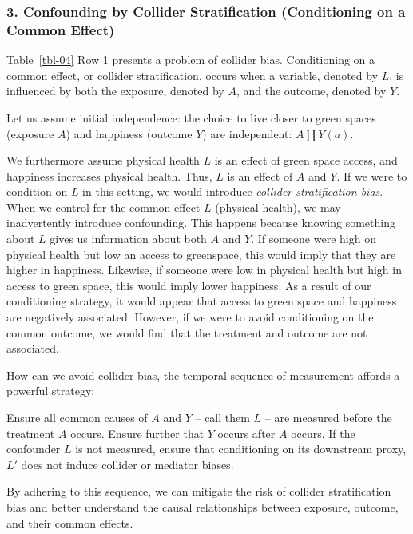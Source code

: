 \documentclass[
  singlecolumn]{article}
\begin{document}
\subsubsection{3. Confounding by Collider Stratification (Conditioning
on a Common
Effect)}\label{confounding-by-collider-stratification-conditioning-on-a-common-effect}

Table~\ref{tbl-04} Row 1 presents a problem of collider bias.
Conditioning on a common effect, or collider stratification, occurs when
a variable, denoted by \(L\), is influenced by both the exposure,
denoted by \(A\), and the outcome, denoted by \(Y\).

Let us assume initial independence: the choice to live closer to green
spaces (exposure \(A\)) and happiness (outcome \(Y\)) are independent:
\(A \coprod Y(a)\).

We furthermore assume physical health \(L\) is an effect of green space
access, and happiness increases physical health. Thus, \(L\) is an
effect of \(A\) and \(Y\). If we were to condition on \(L\) in this
setting, we would introduce \emph{collider stratification bias}. When we
control for the common effect \(L\) (physical health), we may
inadvertently introduce confounding. This happens because knowing
something about \(L\) gives us information about both \(A\) and \(Y\).
If someone were high on physical health but low an access to greenspace,
this would imply that they are higher in happiness. Likewise, if someone
were low in physical health but high in access to green space, this
would imply lower happiness. As a result of our conditioning strategy,
it would appear that access to green space and happiness are negatively
associated. However, if we were to avoid conditioning on the common
outcome, we would find that the treatment and outcome are not
associated.

How can we avoid collider bias, the temporal sequence of measurement
affords a powerful strategy:

Ensure all common causes of \(A\) and \(Y\) -- call them \(L\) -- are
measured before the treatment \(A\) occurs. Ensure further that \(Y\)
occurs after \(A\) occurs. If the confounder \(L\) is not measured,
ensure that conditioning on its downstream proxy, \(L'\) does not induce
collider or mediator biases.

By adhering to this sequence, we can mitigate the risk of collider
stratification bias and better understand the causal relationships
between exposure, outcome, and their common effects.
\end{document}
